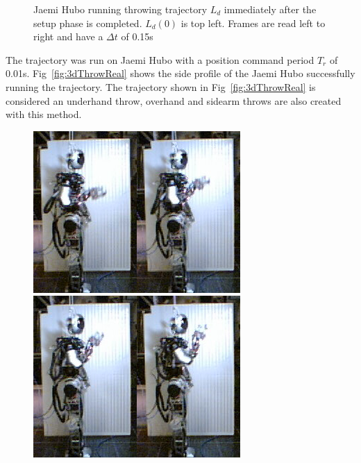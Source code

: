 \begin{figure}[thpb]
  \caption{Jaemi Hubo running throwing trajectory $L_d$ immediately after the setup phase is completed.  $L_d(0)$ is top left.  Frames are read left to right and have a $\Delta t$ of 0.15s}
  \label{fig:fThrow}
\end{figure}



The trajectory was run on Jaemi Hubo with a position command period $T_r$ of 0.01s.  Fig~\ref{fig:3dThrowReal} shows the side profile of the Jaemi Hubo successfully running the trajectory.  The trajectory shown in Fig~\ref{fig:3dThrowReal} is considered an underhand throw, overhand and sidearm throws are also created with this method.

\begin{figure}[thpb]
  \centering
\includegraphics[width=0.25\columnwidth]{./pictures/slowMotion/1.png}\includegraphics[width=0.25\columnwidth]{./pictures/slowMotion/2.png}\includegraphics[width=0.25\columnwidth]{./pictures/slowMotion/3.png}\includegraphics[width=0.25\columnwidth]{./pictures/slowMotion/4.png}

\end{figure}
